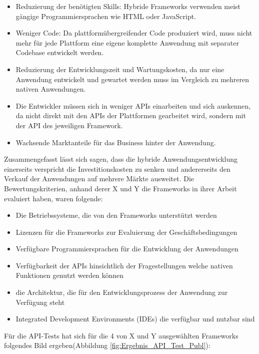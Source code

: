 \begin{itemize}
\item Reduzierung der benötigten Skills: Hybride Frameworks verwenden meist gängige Programmiersprachen wie HTML oder JavaScript.
\item Weniger Code: Da plattformübergreifender Code produziert wird, muss nicht mehr für jede Plattform eine eigene komplette Anwendung mit separater Codebase entwickelt werden.
\item Reduzierung der Entwicklungszeit und Wartungskosten, da nur eine Anwendung entwickelt und gewartet werden muss im Vergleich zu mehreren nativen Anwendungen. 
\item Die Entwickler müssen sich in weniger APIs einarbeiten und sich auskennen, da nicht direkt mit den APIs der Plattformen gearbeitet wird, sondern mit der API des jeweiligen Framework.
\item Wachsende Marktanteile für das Business hinter der Anwendung. 
\end{itemize}

Zusammengefasst lässt sich sagen, dass die hybride Anwendungsentwicklung einerseits verspricht die Investitionskosten zu senken und andererseits den Verkauf der Anwendungen auf mehrere Märkte ausweitet. Die Bewertungskriterien, anhand derer X und Y die Frameworks in ihrer Arbeit evaluiert haben, waren folgende: 

\begin{itemize}
\item Die Betriebssysteme, die von den Frameworks unterstützt werden
\item Lizenzen für die Frameworks zur Evaluierung der Geschäftsbedingungen
\item Verfügbare Programmiersprachen für die Entwicklung der Anwendungen
\item Verfügbarkeit der APIs hinsichtlich der Fragestellungen welche nativen Funktionen genutzt werden können
\item die Architektur, die für den Entwicklungsprozess der Anwendung zur Verfügung steht
\item Integrated Development Environments (IDEs) die verfügbar und nutzbar sind
\end{itemize}

Für die API-Tests hat sich für die 4 von X und Y ausgewählten Frameworks folgendes Bild ergeben(Abbildung \ref{fig:Ergebnis_API_Test_Publ}): 

